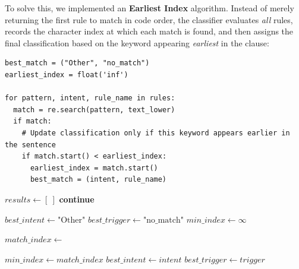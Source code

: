 \documentclass[twoside,final]{hcmut-report}
\begin{document}
\medskip

To solve this, we implemented an \textbf{Earliest Index} algorithm. Instead of merely returning the first rule to match in code order, the classifier evaluates \emph{all} rules, records the character index at which each match is found, and then assigns the final classification based on the keyword appearing \emph{earliest} in the clause:

\begin{verbatim}
best_match = ("Other", "no_match")
earliest_index = float('inf')

for pattern, intent, rule_name in rules:
  match = re.search(pattern, text_lower)
  if match:
    # Update classification only if this keyword appears earlier in the sentence
    if match.start() < earliest_index:
      earliest_index = match.start()
      best_match = (intent, rule_name)
\end{verbatim}

\begin{algorithm}[H]
  \footnotesize
  \caption{Clause Intent Classification via Earliest-Index Matching}
  \begin{algorithmic}[1]
     
    \State $results \gets [\ ]$
    \State {}
    \State \textbf{continue}
    \EndIf

    \State $best\_intent \gets \text{"Other"}$
    \State $best\_trigger \gets \text{"no\_match"}$
    \State $min\_index \gets \infty$

    \State $match\_index \gets$ 

    \State $min\_index \gets match\_index$
    \State $best\_intent \gets intent$
    \State $best\_trigger \gets trigger$
    \EndIf
    \EndFor

    \State {}
    \EndFor

    \State \Return {}
    \EndProcedure
  \end{algorithmic}
\end{algorithm}
\end{document}
